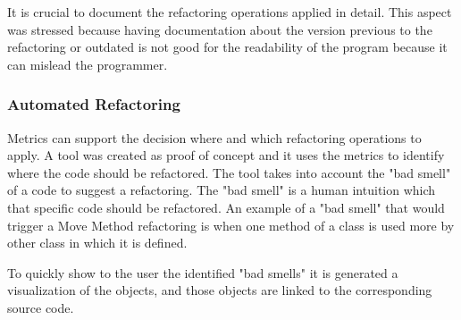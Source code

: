 It is crucial to document the refactoring operations applied in detail. 
This aspect was stressed because having documentation about the version previous to the refactoring or outdated is not good for the readability of the program because it can mislead the programmer.









\subsubsection{Automated Refactoring}
Metrics can support the decision where and which refactoring operations to apply. \cite{simon2001metrics}
A tool was created as proof of concept and it uses the metrics to identify where the code should be refactored.
The tool takes into account the "bad smell" of a code to suggest a refactoring. The "bad smell" is a human intuition which that specific code should be refactored. 
An example of a "bad smell" that would trigger a Move Method refactoring is when one method of a class is used more by other class in which it is defined.

To quickly show to the user the identified "bad smells" it is generated a visualization of the objects, and those objects are linked to the corresponding source code. 


